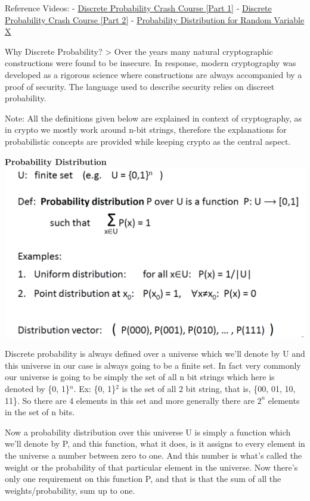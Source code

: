 \documentclass[11pt]{article}
\makeatletter
\def\maxwidth{\ifdim\Gin@nat@width>\linewidth\linewidth
    \else\Gin@nat@width\fi}
\let\Oldincludegraphics\includegraphics
\renewcommand{\includegraphics}[1]{\Oldincludegraphics[width=.8\maxwidth]{#1}}
\makeatother
\begin{document}
Reference Videos: -
\href{https://www.coursera.org/learn/crypto/lecture/qaEcL/discrete-probability-crash-course}{Discrete
Probability Crash Course {[}Part 1{]}} -
\href{https://www.coursera.org/learn/crypto/lecture/JkDRg/discrete-probability-crash-course-cont}{Discrete
Probability Crash Course {[}Part 2{]}} -
\href{https://www.youtube.com/watch?v=cqK3uRoPtk0}{Probability
Distribution for Random Variable X}

Why Discrete Probability? \textgreater{} Over the years many natural
cryptographic constructions were found to be insecure. In response,
modern cryptography was developed as a rigorous science where
constructions are always accompanied by a proof of security. The
language used to describe security relies on discreet probability.

Note: All the definitions given below are explained in context of
cryptography, as in crypto we mostly work around n-bit strings,
therefore the explanations for probabilistic concepts are provided while
keeping crypto as the central aspect.

\textbf{Probability Distribution}
\includegraphics{./Images/ProbabilityDistribution.png}

Discrete probability is always defined over a universe which we'll
denote by U and this universe in our case is always going to be a finite
set. In fact very commonly our universe is going to be simply the set of
all n bit strings which here is denoted by \{0, 1\}\(^n\). Ex: \{0,
1\}\(^2\) is the set of all 2 bit string, that is, \{00, 01, 10, 11\}.
So there are 4 elements in this set and more generally there are \(2^n\)
elements in the set of n bits.

Now a probability distribution over this universe U is simply a function
which we'll denote by P, and this function, what it does, is it assigns
to every element in the universe a number between zero to one. And this
number is what's called the weight or the probability of that particular
element in the universe. Now there's only one requirement on this
function P, and that is that the sum of all the weights/probability, sum
up to one.
\end{document}
